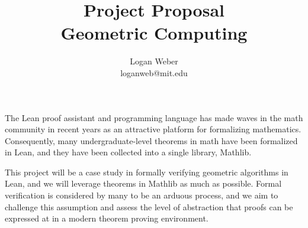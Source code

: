 \documentclass{article}
\begin{document}
\title{%
  Project Proposal
  \\[0.5em]
  \large Geometric Computing \\
}

\author{
Logan Weber\\
loganweb@mit.edu
}

\def\aSigma{\overline{\Sigma}}
\def\asigma{\overline{\sigma}}
\def\aheap{\overline{h}}

\date{}

\maketitle

The Lean proof assistant and programming language has made waves in the math community in recent years as an attractive platform for formalizing mathematics.
Consequently, many undergraduate-level theorems in math have been formalized in Lean, and they have been collected into a single library, Mathlib.

This project will be a case study in formally verifying geometric algorithms in Lean, and we will leverage theorems in Mathlib as much as possible.
Formal verification is considered by many to be an arduous process, and we aim to challenge this assumption and assess the level of abstraction that proofs can be expressed at in a modern theorem proving environment.
\end{document}
